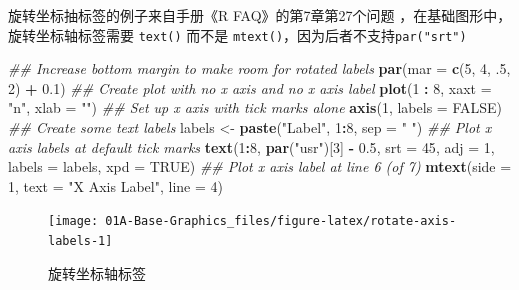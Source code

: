 \documentclass[a4paper,oneside,UTF8]{book}
\newenvironment{Shaded}{\begin{snugshade}}{\end{snugshade}}
\newcommand{\CommentTok}[1]{\textcolor[rgb]{0.56,0.35,0.01}{\textit{#1}}}
\newcommand{\DataTypeTok}[1]{\textcolor[rgb]{0.13,0.29,0.53}{#1}}
\newcommand{\DecValTok}[1]{\textcolor[rgb]{0.00,0.00,0.81}{#1}}
\newcommand{\FloatTok}[1]{\textcolor[rgb]{0.00,0.00,0.81}{#1}}
\newcommand{\KeywordTok}[1]{\textcolor[rgb]{0.13,0.29,0.53}{\textbf{#1}}}
\newcommand{\NormalTok}[1]{#1}
\newcommand{\OperatorTok}[1]{\textcolor[rgb]{0.81,0.36,0.00}{\textbf{#1}}}
\newcommand{\OtherTok}[1]{\textcolor[rgb]{0.56,0.35,0.01}{#1}}
\newcommand{\StringTok}[1]{\textcolor[rgb]{0.31,0.60,0.02}{#1}}
\begin{document}
旋转坐标抽标签的例子来自手册《R FAQ》的第7章第27个问题 \citep{R-FAQ}，在基础图形中，旋转坐标轴标签需要 \texttt{text()} 而不是 \texttt{mtext()}，因为后者不支持\texttt{par("srt")}

\begin{Shaded}
\begin{Highlighting}[]
\CommentTok{## Increase bottom margin to make room for rotated labels}
\KeywordTok{par}\NormalTok{(}\DataTypeTok{mar =} \KeywordTok{c}\NormalTok{(}\DecValTok{5}\NormalTok{, }\DecValTok{4}\NormalTok{, }\FloatTok{.5}\NormalTok{, }\DecValTok{2}\NormalTok{) }\OperatorTok{+}\StringTok{ }\FloatTok{0.1}\NormalTok{)}
\CommentTok{## Create plot with no x axis and no x axis label}
\KeywordTok{plot}\NormalTok{(}\DecValTok{1} \OperatorTok{:}\StringTok{ }\DecValTok{8}\NormalTok{, }\DataTypeTok{xaxt =} \StringTok{"n"}\NormalTok{,  }\DataTypeTok{xlab =} \StringTok{""}\NormalTok{)}
\CommentTok{## Set up x axis with tick marks alone}
\KeywordTok{axis}\NormalTok{(}\DecValTok{1}\NormalTok{, }\DataTypeTok{labels =} \OtherTok{FALSE}\NormalTok{)}
\CommentTok{## Create some text labels}
\NormalTok{labels <-}\StringTok{ }\KeywordTok{paste}\NormalTok{(}\StringTok{"Label"}\NormalTok{, }\DecValTok{1}\OperatorTok{:}\DecValTok{8}\NormalTok{, }\DataTypeTok{sep =} \StringTok{" "}\NormalTok{)}
\CommentTok{## Plot x axis labels at default tick marks}
\KeywordTok{text}\NormalTok{(}\DecValTok{1}\OperatorTok{:}\DecValTok{8}\NormalTok{, }\KeywordTok{par}\NormalTok{(}\StringTok{"usr"}\NormalTok{)[}\DecValTok{3}\NormalTok{] }\OperatorTok{-}\StringTok{ }\FloatTok{0.5}\NormalTok{, }\DataTypeTok{srt =} \DecValTok{45}\NormalTok{, }\DataTypeTok{adj =} \DecValTok{1}\NormalTok{,}
     \DataTypeTok{labels =}\NormalTok{ labels, }\DataTypeTok{xpd =} \OtherTok{TRUE}\NormalTok{)}
\CommentTok{## Plot x axis label at line 6 (of 7)}
\KeywordTok{mtext}\NormalTok{(}\DataTypeTok{side =} \DecValTok{1}\NormalTok{, }\DataTypeTok{text =} \StringTok{"X Axis Label"}\NormalTok{, }\DataTypeTok{line =} \DecValTok{4}\NormalTok{)}
\end{Highlighting}
\end{Shaded}

\begin{figure}

{\centering \texttt{[image: 01A-Base-Graphics\_files/figure-latex/rotate-axis-labels-1]} 

}

\caption{旋转坐标轴标签}\label{fig:rotate-axis-labels}
\end{figure}
\end{document}
